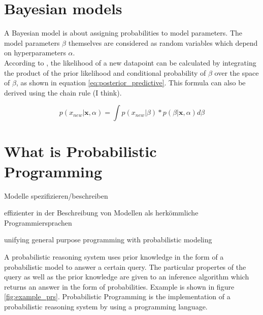 \documentclass{article}
\begin{document}
\section{Bayesian models}

A Bayesian model is about assigning probabilities to model parameters. The model parameters $\beta$ themselves are considered as random variables which depend on hyperparameters $\alpha$.
\\
According to \cite{Wang2018}, the likelihood of a new datapoint can be calculated by integrating the product of the prior likelihood and conditional probability of $\beta$ over the space of $\beta$, as shown in equation \ref{eq:posterior_predictive}. This formula can also be derived using the chain rule (I think).



\begin{equation}
p(x_{new}|\boldsymbol x, \alpha) = \int p(x_{new}|\beta) * p(\beta | \boldsymbol x,\alpha) d \beta
\label{eq:posterior_predictive}
\end{equation}



\section{What is Probabilistic Programming}

Modelle spezifizieren/beschreiben

\cite{wiki:Probabilisticprogramminglanguage}

effizienter in der Beschreibung von Modellen als herkömmliche Programmiersprachen \cite{Hardesty2015}

unifying general purpose programming with probabilistic modeling \cite{probabilistic-programming.org}


A \gls{probabilistic reasoning system} uses prior knowledge in the form of a \gls{probabilistic model} to answer a certain query. The particular propertes of the query as well as the prior knowledge are given to an \gls{inference algorithm} which returns an answer in the form of probabilities. Example is shown in figure \ref{fig:example_prs}. Probabilistic Programming is the implementation of a \gls{probabilistic reasoning system} by using a programming language.
\end{document}
